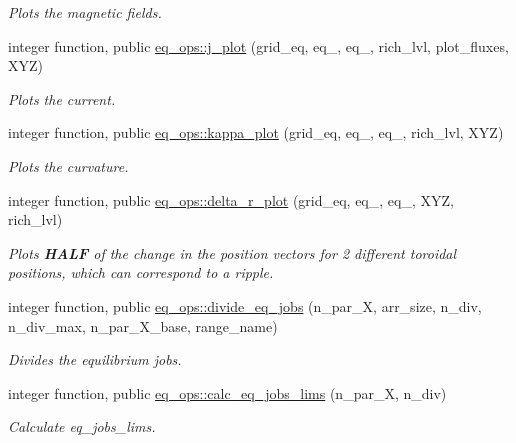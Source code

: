 \begin{DoxyCompactItemize}
\begin{DoxyCompactList}\small\item\em Plots the magnetic fields. \end{DoxyCompactList}\item 
integer function, public \hyperlink{namespaceeq__ops_afabdf28e5c26ceb87e6eb8cf3809919d}{eq\+\_\+ops\+::j\+\_\+plot} (grid\+\_\+eq, eq\+\_, eq\+\_, rich\+\_\+lvl, plot\+\_\+fluxes, X\+YZ)
\begin{DoxyCompactList}\small\item\em Plots the current. \end{DoxyCompactList}\item 
integer function, public \hyperlink{namespaceeq__ops_ad173efd111cb85c11bc2bc78a7555096}{eq\+\_\+ops\+::kappa\+\_\+plot} (grid\+\_\+eq, eq\+\_, eq\+\_, rich\+\_\+lvl, X\+YZ)
\begin{DoxyCompactList}\small\item\em Plots the curvature. \end{DoxyCompactList}\item 
integer function, public \hyperlink{namespaceeq__ops_ac0a79893900631d25b170be0abd2c131}{eq\+\_\+ops\+::delta\+\_\+r\+\_\+plot} (grid\+\_\+eq, eq\+\_, eq\+\_, X\+YZ, rich\+\_\+lvl)
\begin{DoxyCompactList}\small\item\em Plots {\bfseries H\+A\+LF} of the change in the position vectors for 2 different toroidal positions, which can correspond to a ripple. \end{DoxyCompactList}\item 
integer function, public \hyperlink{namespaceeq__ops_a8fae749abe55865d8135fef536a8e8f1}{eq\+\_\+ops\+::divide\+\_\+eq\+\_\+jobs} (n\+\_\+par\+\_\+X, arr\+\_\+size, n\+\_\+div, n\+\_\+div\+\_\+max, n\+\_\+par\+\_\+\+X\+\_\+base, range\+\_\+name)
\begin{DoxyCompactList}\small\item\em Divides the equilibrium jobs. \end{DoxyCompactList}\item 
integer function, public \hyperlink{namespaceeq__ops_a4e20b8725fce149449f83754244dc84e}{eq\+\_\+ops\+::calc\+\_\+eq\+\_\+jobs\+\_\+lims} (n\+\_\+par\+\_\+X, n\+\_\+div)
\begin{DoxyCompactList}\small\item\em Calculate {\ttfamily eq\+\_\+jobs\+\_\+lims}. \end{DoxyCompactList}\item 

\end{DoxyCompactItemize}
